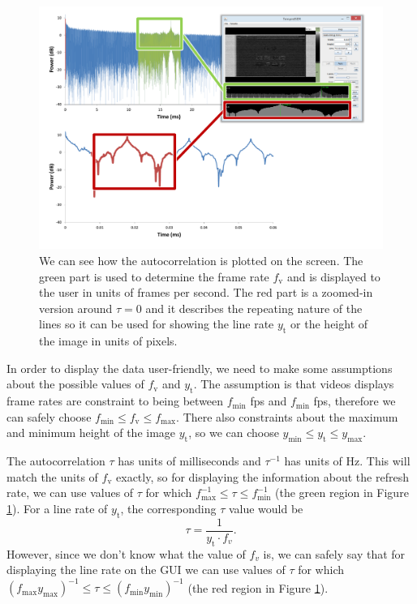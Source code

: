 \documentclass[a4paper,12pt,twoside,openright]{report}
\begin{document}
\begin{figure}[h]
\centering
\includegraphics[width=1\textwidth]{autocorr_compare}
\caption{We can see how the autocorrelation is plotted on the screen. The green part is used to determine the frame rate $f_\text{v}$ and is displayed to the user in units of frames per second. The red part is a zoomed-in version around $\tau = 0$ and it describes the repeating nature of the lines so it can be used for showing the line rate $y_\text{t}$ or the height of the image in units of pixels.}
\label{fig:autocorr_gui}
\end{figure}

In order to display the data user-friendly, we need to make some assumptions about the possible values of $f_\text{v}$ and $y_\text{t}$. The assumption is that videos displays frame rates are constraint to being between $f_\text{min}$ fps and $f_\text{min}$ fps, therefore we can safely choose $f_\text{min} \leq f_\text{v} \leq f_\text{max}$. There also constraints about the maximum and minimum height of the image $y_\text{t}$, so we can choose $y_\text{min} \leq y_\text{t} \leq y_\text{max}$.

The autocorrelation $\tau$ has units of milliseconds and $\tau^{-1}$ has units of Hz. This will match the units of $f_\text{v}$ exactly, so for displaying the information about the refresh rate, we can use values of $\tau$ for which $f^{-1}_\text{max} \leq \tau \leq f^{-1}_\text{min}$ (the green region in Figure \ref{fig:autocorr_gui}). For a line rate of $y_\text{t}$, the corresponding $\tau$ value would be
$$ \tau = \frac{1}{y_\text{t} \cdot f_{v}} .$$
However, since we don't know what the value of $f_{v}$ is, we can safely say that for displaying the line rate on the GUI we can use values of $\tau$ for which $\left( f_\text{max} y_\text{max} \right)^{-1} \leq \tau \leq \left( f_\text{min} y_\text{min} \right)^{-1}$ (the red region in Figure \ref{fig:autocorr_gui}). 
\end{document}
